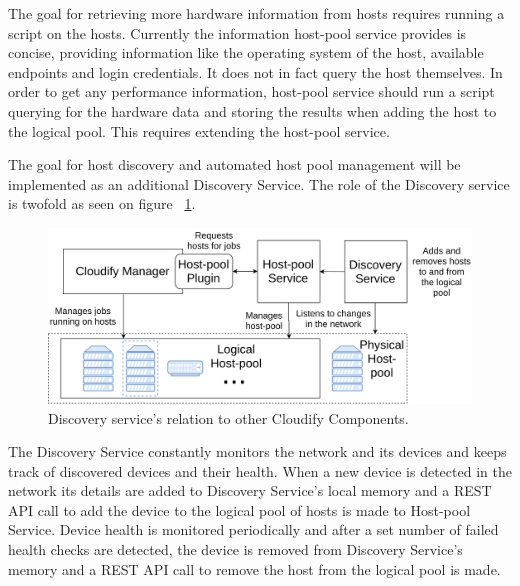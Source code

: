 The goal for retrieving more hardware information from hosts requires running a script on the hosts. Currently the information host-pool service provides is concise, providing information like the operating system of the host, available endpoints and login credentials. It does not in fact query the host themselves. In order to get any performance information, host-pool service should run a script querying for the hardware data and storing the results when adding the host to the logical pool. This requires extending  the host-pool service.

The goal for host discovery and automated host pool management will be implemented as an additional Discovery Service.
The role of the Discovery service is twofold as seen on figure ~\ref{fig:discovery_service}.


\begin{figure}[ht!]
\centering
  \includegraphics[width=\textwidth, keepaspectratio]{Discovery_service.png}%
  \caption{Discovery service's relation to other Cloudify Components.}
  \label{fig:discovery_service}
\end{figure}

The Discovery Service constantly monitors the network and its devices and keeps track of discovered devices and their health. When a new device is detected in the network its details are added to Discovery Service's local memory and a REST API call to add the device to the logical pool of hosts is made to Host-pool Service. Device health is monitored periodically and after a set number of failed health checks are detected, the device is removed from Discovery Service's memory and a REST API call to remove the host from the logical pool is made.
